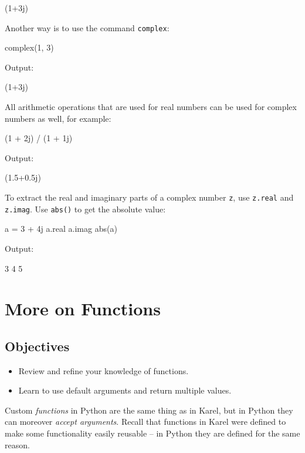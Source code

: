 \begin{greencode}
(1+3j)
\end{greencode}
Another way is to use the command {\tt complex}:

\begin{bluecode}
complex(1, 3)
\end{bluecode}
Output:

\begin{greencode}
(1+3j)
\end{greencode}
All arithmetic operations that are used for real numbers can be 
used for complex numbers as well, for example:

\begin{bluecode}
(1 + 2j) / (1 + 1j)
\end{bluecode}
Output:

\begin{greencode}
(1.5+0.5j)
\end{greencode}
To extract the real and imaginary parts of a complex number {\tt z}, use {\tt z.real}
and {\tt z.imag}. Use {\tt abs()} to get the absolute value:

\begin{bluecode}
a = 3 + 4j
a.real
a.imag
abs(a)
\end{bluecode}
Output:

\begin{greencode}
3
4
5
\end{greencode}


\section{More on Functions}

\subsection{Objectives}

\begin{itemize}
\item Review and refine your knowledge of functions.
\item Learn to use default arguments and return multiple values.
\end{itemize}
Custom {\em functions} in Python are the same thing as in Karel, 
but in Python they can moreover {\em accept arguments}. Recall that 
functions in Karel were defined to make some functionality easily 
reusable -- in Python they are defined for the same reason.

